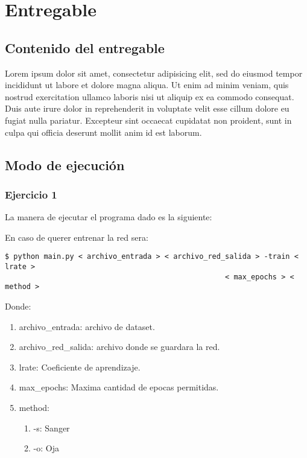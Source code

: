 \section{Entregable}
\subsection{Contenido del entregable}
Lorem ipsum dolor sit amet, consectetur adipisicing elit, sed do eiusmod
tempor incididunt ut labore et dolore magna aliqua. Ut enim ad minim veniam,
quis nostrud exercitation ullamco laboris nisi ut aliquip ex ea commodo
consequat. Duis aute irure dolor in reprehenderit in voluptate velit esse
cillum dolore eu fugiat nulla pariatur. Excepteur sint occaecat cupidatat non
proident, sunt in culpa qui officia deserunt mollit anim id est laborum.

\subsection{Modo de ejecución}


\subsubsection{Ejercicio 1}


La manera de ejecutar el programa dado es la siguiente:

En caso de querer entrenar la red sera:

\begin{verbatim}
$ python main.py < archivo_entrada > < archivo_red_salida > -train < lrate > 
                                                   < max_epochs > < method >    
\end{verbatim}

Donde:

\begin{enumerate}
\item archivo\_entrada: archivo de dataset.
\item archivo\_red\_salida: archivo donde se guardara la red.
\item lrate: Coeficiente de aprendizaje.
\item max\_epochs: Maxima cantidad de epocas permitidas.
\item method: 
\begin{enumerate}
\item -s: Sanger
\item -o: Oja
\end{enumerate}
\end{enumerate}

